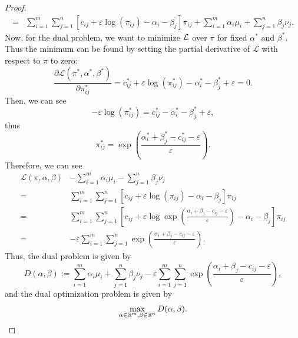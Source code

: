 \begin{proof}
\begin{align}
		= & \sum_{i=1}^m \sum_{j=1}^n \left[c_{ij} + \varepsilon \log(\pi_{ij}) - \alpha_i - \beta_j \right] \pi_{ij}  + \sum_{i=1}^m \alpha_i \mu_i + \sum_{j=1}^n \beta_j \nu_j. \label{eq:lagrangian}
	\end{align}
	Now, for the dual problem, we want to minimize $\mathcal{L}$ over $\pi$ for fixed $\alpha^*$ and $\beta^*$. Thus the minimum can be found by setting the partial derivative of $\mathcal{L}$ with respect to $\pi$ to zero:
	\begin{equation*}
		\frac{\partial 	\mathcal{L}(\pi^*, \alpha^*, \beta^*) }{\partial \pi^*_{ij}} = c^*_{ij} + \varepsilon \log(\pi_{ij}^*) - \alpha^*_i - \beta^*_j + \varepsilon  = 0.
	\end{equation*}
	Then, we can see
	\begin{equation*}
		-\varepsilon \log(\pi_{ij}^*) = c^*_{ij} - \alpha^*_i - \beta^*_j + \varepsilon,
	\end{equation*}
	thus
	\begin{equation}
		\pi_{ij}^* = \exp\left(\frac{\alpha_i^* + \beta_j^* - c_{ij}^* - \varepsilon}{\varepsilon}\right).
		\label{eq:rhodef}
	\end{equation}
	Therefore, we can see
	\begin{align*}
		\mathcal{L}(\pi, \alpha, \beta)& - \sum_{i=1}^m \alpha_i \mu_i - \sum_{j=1}^n \beta_j \nu_j \\
		=& \sum_{i=1}^m \sum_{j=1}^n \left[c_{ij} + \varepsilon \log(\pi_{ij}) - \alpha_i - \beta_j \right] \pi_{ij} \\
		=&  \sum_{i=1}^m \sum_{j=1}^n \left[c_{ij} + \varepsilon \log\exp\left(\frac{\alpha_i + \beta_j - c_{ij} - \varepsilon}{\varepsilon}\right) - \alpha_i - \beta_j \right] \pi_{ij} \\
		=& -\varepsilon \sum_{i=1}^m \sum_{j=1}^n \exp\left(\frac{\alpha_i + \beta_j - c_{ij} - \varepsilon}{\varepsilon}\right).
	\end{align*}
	Thus, the dual problem is given by
	\begin{equation*}
		D(\alpha, \beta) := \sum_{i=1}^m \alpha_i \mu_i + \sum_{j=1}^n \beta_j \nu_j - \varepsilon \sum_{i=1}^m \sum_{j=1}^n \exp\left(\frac{\alpha_i + \beta_j - c_{ij} - \varepsilon}{\varepsilon}\right),
	\end{equation*}
	and the dual optimization problem is given by
	\begin{equation*}
		\max_{\alpha \in \mathbb{R}^m, \beta\in \mathbb{R}^n} D(\alpha, \beta).
	\end{equation*}
\end{proof}

